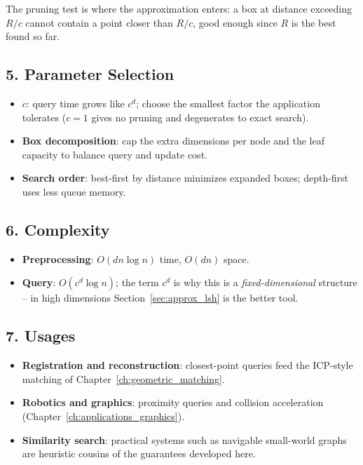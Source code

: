 The pruning test is where the approximation enters: a box at distance
exceeding $R/c$ cannot contain a point closer than $R/c$, good enough since
$R$ is the best found so far.

\subsection{5. Parameter Selection}

\begin{itemize}
\item \textbf{$c$}: query time grows like $c^d$; choose the smallest factor
  the application tolerates ($c = 1$ gives no pruning and degenerates to
  exact search).
\item \textbf{Box decomposition}: cap the extra dimensions per node and the
  leaf capacity to balance query and update cost.
\item \textbf{Search order}: best-first by distance minimizes expanded
  boxes; depth-first uses less queue memory.
\end{itemize}

\subsection{6. Complexity}

\begin{itemize}
\item \textbf{Preprocessing}: $O(dn \log n)$ time, $O(dn)$ space.
\item \textbf{Query}: $O(c^d \log n)$; the term $c^d$ is why this is a
  \emph{fixed-dimensional} structure -- in high dimensions
  Section~\ref{sec:approx_lsh} is the better tool.
\end{itemize}

\subsection{7. Usages}

\begin{itemize}
\item \textbf{Registration and reconstruction}: closest-point queries feed
  the ICP-style matching of Chapter~\ref{ch:geometric_matching}.
\item \textbf{Robotics and graphics}: proximity queries and collision
  acceleration (Chapter~\ref{ch:applications_graphics}).
\item \textbf{Similarity search}: practical systems such as navigable
  small-world graphs \cite{malkov2018} are heuristic cousins of the
  guarantees developed here.
\end{itemize}


